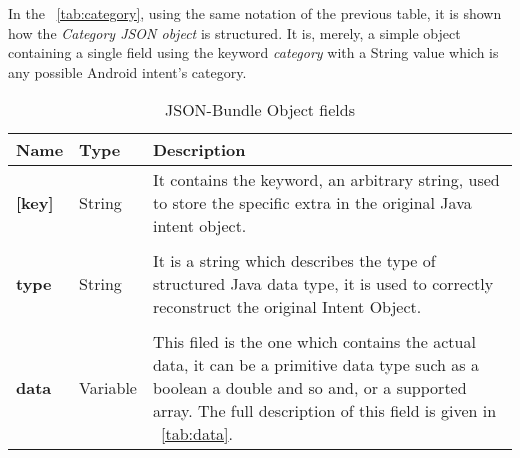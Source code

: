 In the \tablename~\ref{tab:category}, using the same notation of the previous table, it is shown how the \textit{Category JSON object} is structured. It is, merely, a simple object containing a single field using the keyword \textit{category} with a String value which is any possible Android intent's category.
\bigskip
\bigskip
\bigskip
\bigskip
\bigskip

\begin{table}[h]
	\caption{JSON-Bundle Object fields}
	\label{tab:Bundle}
	\centering
	\begin{center}
		
		\begin{tabular}{>{\centering\arraybackslash} m{}p{}p{}}
			
			\toprule
			\centering\textbf{Name} & \centering\textbf{Type}  &	\textbf{Description} \\
			\midrule
			\centering\textbf{[key]\footnotemark[1]} & \begin{minipage}[t]{0.25\textwidth}
				\centering
				String
			\end{minipage} & \begin{minipage}[t]{0.55\textwidth}
				It contains the keyword, an arbitrary string, used to store the specific extra in the original Java intent object.
			\end{minipage}\\%
			&&\\
			\centering\textbf{type} & \begin{minipage}[t]{0.25\textwidth}
				\centering
				String
			\end{minipage} & \begin{minipage}[t]{0.55\textwidth}
				It is a string which describes the type of structured Java data type, it is used to correctly reconstruct the original Intent Object.
			\end{minipage}\\%
			&&\\
			\centering\textbf{data} & \begin{minipage}[t]{0.25\textwidth}
				\centering
				Variable
			\end{minipage} & \begin{minipage}[t]{0.55\textwidth}
				This filed is the one which contains the actual data, it can be a primitive data type such as a boolean a double and so and, or a supported array. The full description of this field is given in \tablename~\ref{tab:data}.
			\end{minipage}\\%
			\bottomrule
			
		\end{tabular}
	\end{center}
\end{table}
